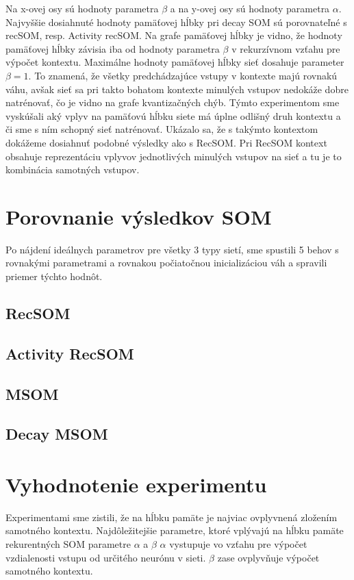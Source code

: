Na x-ovej osy sú hodnoty parametra $\beta$ a na y-ovej osy sú hodnoty parametra $\alpha$.
Najvyššie dosiahnuté hodnoty pamäťovej hĺbky pri decay SOM sú porovnateľné s recSOM, resp. Activity recSOM.
Na grafe pamäťovej hĺbky je vidno, že hodnoty pamäťovej hĺbky závisia iba od hodnoty parametra $\beta$ v rekurzívnom vzťahu
pre výpočet kontextu.
Maximálne hodnoty pamäťovej hĺbky sieť dosahuje parameter $\beta = 1$. To znamená, že všetky predchádzajúce vstupy v kontexte majú
rovnakú váhu, avšak sieť sa pri takto bohatom kontexte minulých vstupov nedokáže dobre natrénovať, čo je vidno na grafe kvantizačných chýb.
Týmto experimentom sme vyskúšali aký vplyv na pamäťovú hĺbku siete má úplne odlišný druh kontextu a či sme s ním schopný sieť natrénovať.
Ukázalo sa, že s takýmto kontextom dokážeme dosiahnuť podobné výsledky ako s RecSOM. 
Pri RecSOM kontext obsahuje reprezentáciu vplyvov jednotlivých minulých vstupov na sieť a tu je to kombinácia samotných vstupov. 



\section {Porovnanie výsledkov SOM}
Po nájdení ideálnych parametrov pre všetky 3 typy sietí, sme spustili 5 behov s rovnakými
parametrami a rovnakou počiatočnou inicializáciou váh a spravili priemer týchto hodnôt.

\subsection{RecSOM}

\subsection{Activity RecSOM}
\subsection{MSOM}

\subsection{Decay MSOM}



\section{ Vyhodnotenie experimentu }
Experimentami sme zistili, že na hĺbku pamäte je najviac ovplyvnená zložením samotného kontextu.
Najdôležitejšie parametre, ktoré vplývajú na hĺbku pamäte rekurentných SOM parametre $\alpha$ a $\beta$
$\alpha$ vystupuje vo vzťahu pre výpočet vzdialenosti vstupu od určitého neurónu v sieti.
$\beta$ zase ovplyvňuje výpočet samotného kontextu.



